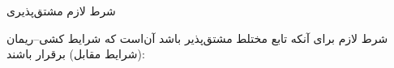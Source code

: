 \begin{EMunit}


\end{EMunit}

\EMhold


\begin{EMtheorem}{شرط لازم مشتق‌پذیری}

شرط لازم برای آنکه تابع مختلط  مشتق‌پذیر باشد آن‌است که شرایط کشی--ریمان (شرایط مقابل) برقرار باشند:

\end{EMtheorem}

